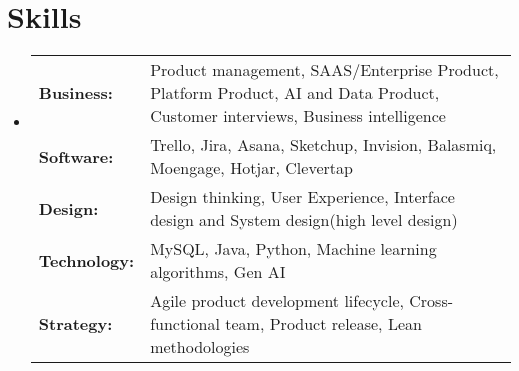\section{Skills}
\begin{itemize}[leftmargin=0.15in, rightmargin=0.15in,label={}]
    \small \item[]
    \begin{tabularx}{\linewidth}{@{}lX@{}}
        \textbf{Business:}{\hspace{8pt}} & Product management, SAAS/Enterprise Product, Platform Product, AI and Data Product, Customer interviews, Business
        intelligence \\
        \textbf{Software:}{\hspace{8pt}} & Trello, Jira, Asana, Sketchup, Invision, Balasmiq, Moengage, Hotjar, Clevertap \\
        \textbf{Design:}{\hspace{8pt}} & Design thinking, User Experience, Interface design and System design(high level design) \\
        \textbf{Technology:}{\hspace{8pt}} & MySQL, Java, Python, Machine learning algorithms, Gen AI \\
        \textbf{Strategy:}{\hspace{8pt}} & Agile product development lifecycle, Cross-functional team, Product release, Lean methodologies \\
    \end{tabularx}
\end{itemize}